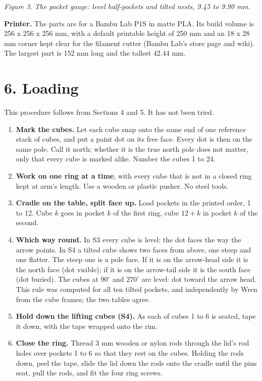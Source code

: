 \documentclass[11pt,a4paper]{article}
\begin{document}
\emph{Figure 3. The pocket gauge: level half-pockets and tilted nests, 9.45 to 9.90 mm.}

{\bfseries\boldmath Printer.} The parts are for a Bambu Lab P1S in matte PLA. Its build volume is 256 x 256 x 256 mm, with a default printable height of 250 mm and an 18 x 28 mm corner kept clear for the filament cutter (Bambu Lab's store page and wiki). The largest part is 152 mm long and the tallest 42.44 mm.


\section*{6. Loading}
This procedure follows from Sections 4 and 5. It has not been tried.

\begin{enumerate}
\item{} {\bfseries\boldmath Mark the cubes.} Let each cube snap onto the same end of one reference stack of cubes, and put a paint dot on its free face. Every dot is then on the same pole. Call it north; whether it is the true north pole does not matter, only that every cube is marked alike. Number the cubes 1 to 24.
\item{} {\bfseries\boldmath Work on one ring at a time}, with every cube that is not in a closed ring kept at arm's length. Use a wooden or plastic pusher. No steel tools.
\item{} {\bfseries\boldmath Cradle on the table, split face up.} Load pockets in the printed order, 1 to 12. Cube $k$ goes in pocket $k$ of the first ring, cube $12+k$ in pocket $k$ of the second.
\item{} {\bfseries\boldmath Which way round.} In S3 every cube is level: the dot faces the way the arrow points. In S4 a tilted cube shows two faces from above, one steep and one flatter. The steep one is a pole face. If it is on the arrow-head side it is the north face (dot visible); if it is on the arrow-tail side it is the south face (dot buried). The cubes at $90^\circ$ and $270^\circ$ are level: dot toward the arrow head. This rule was computed for all ten tilted pockets, and independently by Wren from the cube frames; the two tables agree.
\item{} {\bfseries\boldmath Hold down the lifting cubes (S4).} As each of cubes 1 to 6 is seated, tape it down, with the tape wrapped onto the rim.
\item{} {\bfseries\boldmath Close the ring.} Thread 3 mm wooden or nylon rods through the lid's rod holes over pockets 1 to 6 so that they rest on the cubes. Holding the rods down, peel the tape, slide the lid down the rods onto the cradle until the pins seat, pull the rods, and fit the four ring screws.

\end{enumerate}
\end{document}

